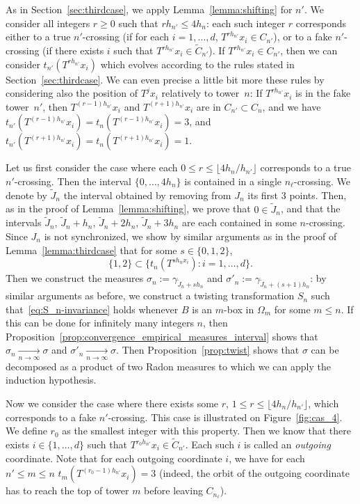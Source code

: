 \documentclass[10pt]{amsart}
\theoremstyle{definition}\newtheorem{defi}[theo]{Definition}\newtheorem{rema}[theo]{Remark}\newtheorem{exam}[theo]{Example}\newtheorem{exem}[theo]{Example}\newtheorem{nota}[theo]{Notation}
\newcommand{\egdef}{:=}
\newcommand{\tend}[3][]{\xrightarrow[#2\to#3]{#1}}
\newcommand{\ovC}{\Omega}
\begin{document}
As in Section~\ref{sec:thirdcase}, we apply Lemma~\ref{lemma:shifting} for $n'$. We consider all integers $r\ge 0$ such that $rh_{n'}\le 4 h_n$: each such integer $r$ corresponds either to a true $n'$-crossing (if for each $i=1,\ldots,d$, $T^{rh_{n'}}x_i\in C_{n'}$), or to a fake $n'$-crossing (if there exists $i$ such that $T^{rh_{n'}}x_i\in \tilde C_{n'}$). If $T^{rh_{n'}}x_i\in C_{n'}$, then we can consider $t_{n'}(T^{rh_{n'}}x_i)$ which evolves according to the rules stated in Section~\ref{sec:thirdcase}. We can even precise a little bit more these rules by considering also the position of $T^jx_i$ relatively to tower~$n$: If $T^{rh_{n'}}x_i$ is in the fake tower~${n'}$, then $T^{(r-1)h_{n'}}x_i$ and $T^{(r+1)h_{n'}}x_i$ are in $C_{n'}\subset C_n$, and we have $t_{n'}(T^{(r-1)h_{n'}}x_i)=t_n(T^{(r-1)h_{n'}}x_i)=3$, and $t_{n'}(T^{(r+1)h_{n'}}x_i)={t_n(T^{(r+1)h_{n'}}x_i)=1}$.


Let us first consider the case where each $0\le r\le \lfloor 4h_n/h_{n'}\rfloor$ corresponds to a true $n'$-crossing. Then the interval $\{0,\ldots,4h_n\}$ is contained in a single $n_\ell$-crossing. We denote by $\tilde J_n$ the interval obtained by removing from $J_n$ its first 3 points. Then, as in the proof of Lemma~\ref{lemma:shifting}, we prove that $0\in \tilde J_n$, and that the intervals $\tilde J_n$, $\tilde J_n+h_n$, $\tilde J_n+2h_n$, $\tilde J_n+3h_n$ are each contained in some $n$-crossing. Since $J_n$ is not synchronized, we show by similar arguments as in the proof of Lemma~\ref{lemma:thirdcase} that for some $s\in\{0,1,2\}$,
\[
\{1,2\}\subset\bigl\{ t_n(T^{sh_nx_i}) : i=1,\ldots,d \bigr\}.
\]
Then we construct the measures $\sigma_n\egdef\gamma_{\tilde J_n+sh_n}$ and $\sigma'_n \egdef\gamma_{\tilde J_n+(s+1)h_n}$: by similar arguments as before, we construct a twisting transformation $S_n$ such that~\eqref{eq:S_n-invariance} holds whenever $B$ is an $m$-box in $\ovC_m$ for some $m\le n$. If this can be done for infinitely many integers $n$, then Proposition~\ref{prop:convergence_empirical_measures_interval} shows that $\sigma_n\tend{n}{\infty}\sigma$ and $\sigma'_n\tend{n}{\infty}\sigma$. Then Proposition~\ref{prop:twist} shows that $\sigma$ can be decomposed as a product of two Radon measures to which we can apply the induction hypothesis.

Now we consider the case where there exists some $r$, $1\le r\le \lfloor 4h_n/h_{n'}\rfloor$, which corresponds to a fake $n'$-crossing. This case is illustrated on Figure~\ref{fig:cas_4}. We define $r_0$ as the smallest integer with this property. Then we know that there exists $i\in\{1,\ldots,d\}$ such that $T^{r_0h_{n'}}x_i\in \tilde C_{n'}$. Each such $i$ is called an \emph{outgoing} coordinate. Note that for each outgoing coordinate $i$, we have for each $n'\le m\le n$ $t_m(T^{(r_0-1)h_{n'}}x_i)=3$ (indeed, the orbit of the outgoing coordinate has to reach the top of tower $m$ before leaving $C_{n_\ell}$).
\end{document}
